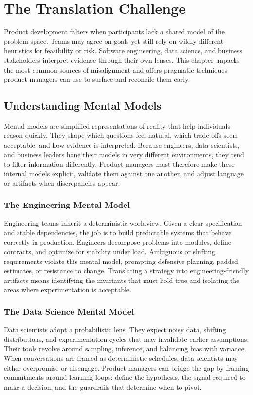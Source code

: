 \chapter{The Translation Challenge}
\label{ch:translation-challenge}

Product development falters when participants lack a shared model of the problem space. Teams may agree on goals yet still rely on wildly different heuristics for feasibility or risk. Software engineering, data science, and business stakeholders interpret evidence through their own lenses. This chapter unpacks the most common sources of misalignment and offers pragmatic techniques product managers can use to surface and reconcile them early.

\section{Understanding Mental Models}
\label{sec:mental-models}

Mental models are simplified representations of reality that help individuals reason quickly. They shape which questions feel natural, which trade-offs seem acceptable, and how evidence is interpreted. Because engineers, data scientists, and business leaders hone their models in very different environments, they tend to filter information differently. Product managers must therefore make these internal models explicit, validate them against one another, and adjust language or artifacts when discrepancies appear.

\subsection{The Engineering Mental Model}
Engineering teams inherit a deterministic worldview. Given a clear specification and stable dependencies, the job is to build predictable systems that behave correctly in production. Engineers decompose problems into modules, define contracts, and optimize for stability under load. Ambiguous or shifting requirements violate this mental model, prompting defensive planning, padded estimates, or resistance to change. Translating a strategy into engineering-friendly artifacts means identifying the invariants that must hold true and isolating the areas where experimentation is acceptable.

\subsection{The Data Science Mental Model}
Data scientists adopt a probabilistic lens. They expect noisy data, shifting distributions, and experimentation cycles that may invalidate earlier assumptions. Their tools revolve around sampling, inference, and balancing bias with variance. When conversations are framed as deterministic schedules, data scientists may either overpromise or disengage. Product managers can bridge the gap by framing commitments around learning loops: define the hypothesis, the signal required to make a decision, and the guardrails that determine when to pivot.

